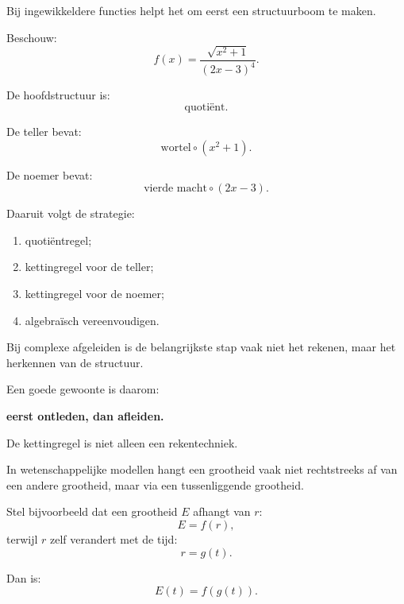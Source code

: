 \documentclass{ximera}
\begin{document}


Bij ingewikkeldere functies helpt het om eerst een structuurboom te maken.

Beschouw:
\[f(x)=\frac{\sqrt{x^2+1}}{(2x-3)^4}.\]

De hoofdstructuur is:
\[\boxed{\text{quotiënt}.}\]

De teller bevat:
\[\boxed{\text{wortel}\circ(x^2+1)}.\]

De noemer bevat:
\[\boxed{\text{vierde macht}\circ(2x-3)}.\]

Daaruit volgt de strategie:

\begin{enumerate}
  \item quotiëntregel;
  \item kettingregel voor de teller;
  \item kettingregel voor de noemer;
  \item algebraïsch vereenvoudigen.
\end{enumerate}


\begin{opmerking}
Bij complexe afgeleiden is de belangrijkste stap vaak niet het rekenen,
maar het herkennen van de structuur.

Een goede gewoonte is daarom:

\begin{center}
\textbf{eerst ontleden, dan afleiden.}
\end{center}
\end{opmerking}




De kettingregel is niet alleen een rekentechniek.

In wetenschappelijke modellen hangt een grootheid vaak niet rechtstreeks
af van een andere grootheid, maar via een tussenliggende grootheid.

Stel bijvoorbeeld dat een grootheid $E$ afhangt van $r$:
\[E=f(r),\]
terwijl $r$ zelf verandert met de tijd:
\[r=g(t).\]

Dan is:
\[E(t)=f(g(t)).\]
\end{document}
